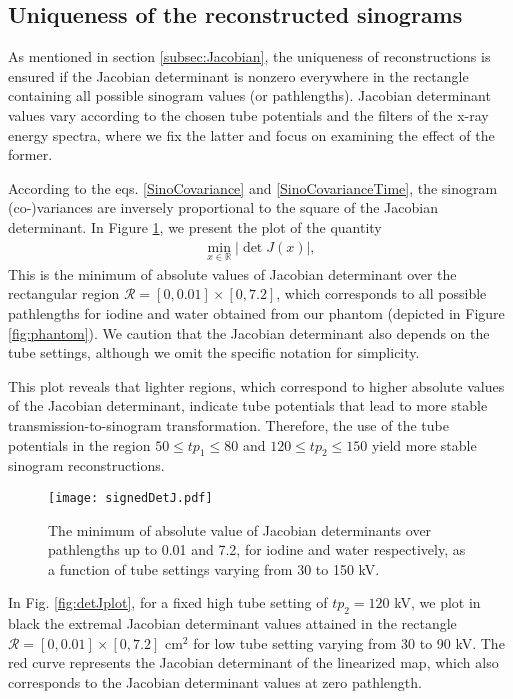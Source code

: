 \documentclass[12pt,twoside]{article}   %
\def\rR{\mathcal{R}}
\begin{document}
\subsection{Uniqueness of the reconstructed sinograms}\label{sec:uniqueness}
As mentioned in section \ref{subsec:Jacobian}, the uniqueness of reconstructions is ensured if the Jacobian determinant is nonzero everywhere in the rectangle containing all possible sinogram values (or pathlengths). Jacobian determinant values vary according to the chosen tube potentials and the filters of the x-ray energy spectra, where we fix the latter and focus on examining the effect of the former. 

According to the eqs. \eqref{SinoCovariance} and \eqref{SinoCovarianceTime}, the sinogram (co-)variances are inversely proportional to the square of the Jacobian determinant. In Figure \ref{fig:signedDetJ}, we present the plot of the quantity
\begin{align}\label{minAbsDetJ}
\min_{x \in \mathbb{R}} |\det J(x)|,
\end{align}
This is the minimum of absolute values of Jacobian determinant over the rectangular region $\mathcal{R} = [0,0.01] \times [0,7.2]$, which corresponds to all possible pathlengths for iodine and water obtained from our phantom (depicted in Figure \ref{fig:phantom}). We caution that the Jacobian determinant also depends on the tube settings, although we omit the specific notation for simplicity.

This plot reveals that lighter regions, which correspond to higher absolute values of the Jacobian determinant, indicate tube potentials that lead to more stable transmission-to-sinogram transformation. Therefore, the use of the tube potentials in the region $50 \le tp_1 \le 80$ and $120 \le tp_2 \le 150$ yield more stable sinogram reconstructions.

\begin{figure}[H]
\centering
\texttt{[image: signedDetJ.pdf]}
\caption{The minimum of absolute value of Jacobian determinants over pathlengths up to 0.01 and 7.2, for iodine and water respectively, as a function of tube settings varying from 30 to 150 kV.}
\label{fig:signedDetJ}
\end{figure}

In Fig. \ref{fig:detJplot}, for a fixed high tube setting of $tp_2=120$ kV, we plot in black the extremal Jacobian determinant values attained in the rectangle $ \rR = [0,0.01]\times[0,7.2]$ cm$^2$ for low tube setting varying from 30 to 90 kV. The red curve represents the Jacobian determinant of the linearized map, which also corresponds to the Jacobian determinant values at zero pathlength. 
\end{document}
